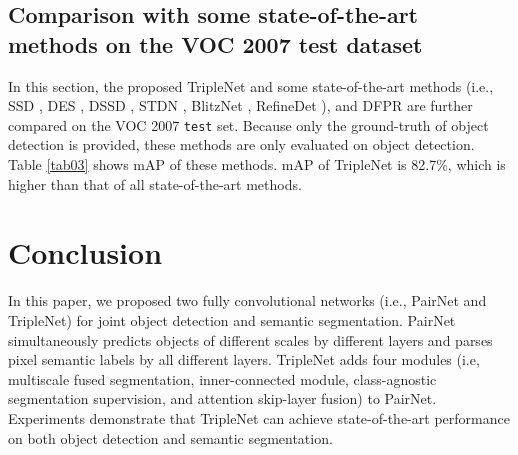 \documentclass[10pt,twocolumn,letterpaper]{article}
\begin{document}
\subsection{Comparison with some state-of-the-art methods on the VOC 2007 test dataset}
In this section, the proposed TripleNet and some state-of-the-art methods (i.e., SSD \cite{Liu_SSD_ECCV_2016}, DES \cite{Zhang_DES_CVPR_2018}, DSSD \cite{Fu_DSSD_arXiv_2017}, STDN \cite{Zhou_STDN_CVPR_2018}, BlitzNet \cite{Dvornik_Blitznet_ICCV_2017}, RefineDet \cite{Lin_Refinenet_CVPR_2017}), and DFPR \cite{Kong_DFPR_ECCV_2018} are further compared on the VOC 2007 \texttt{test} set. Because only the ground-truth of object detection is provided, these methods are only evaluated on object detection. Table \ref{tab03} shows mAP of these methods. mAP of TripleNet is 82.7\%, which is higher than that of all state-of-the-art methods.




\section{Conclusion}
\label{secConclusion}
In this paper, we proposed two fully convolutional networks (i.e., PairNet and TripleNet) for joint object detection and semantic segmentation. PairNet simultaneously predicts objects of different scales by different layers and parses pixel semantic labels by all different layers. TripleNet adds four modules (i.e, multiscale fused segmentation, inner-connected module, class-agnostic segmentation supervision, and attention skip-layer fusion) to PairNet. Experiments demonstrate that TripleNet can achieve state-of-the-art performance on both object detection and semantic segmentation.
\end{document}
